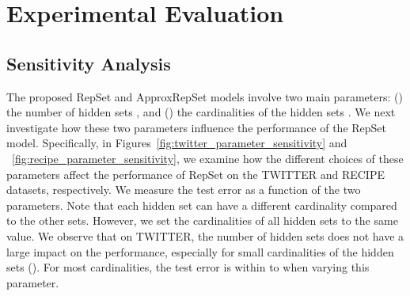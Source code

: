 \documentclass[twoside]{article}
\begin{document}
\section{Experimental Evaluation}\label{sec:further_experiments}

\subsection{Sensitivity Analysis}
The proposed RepSet and ApproxRepSet models involve two main parameters:
() the number of hidden sets , and () the cardinalities of the hidden sets .
We next investigate how these two parameters influence the performance of the RepSet model.
Specifically, in Figures~\ref{fig:twitter_parameter_sensitivity} and ~\ref{fig:recipe_parameter_sensitivity}, we examine how the different choices of these parameters affect the performance of RepSet on the TWITTER and RECIPE datasets, respectively. 
We measure the test error as a function of the two parameters.  
Note that each hidden set  can have a different cardinality compared to the other sets.
However, we set the cardinalities of all hidden sets to the same value.
We observe that on TWITTER, the number of hidden sets  does not have a large impact on the performance, especially for small cardinalities of the hidden sets ().
For most cardinalities, the test error is within  to  when varying this parameter.

\begin{figure*}[t]
\centering
    \begin{minipage}{\columnwidth}
    \centering


\end{minipage}\begin{minipage}{\columnwidth}
    \centering
\end{minipage}
\caption{Average test error of the RepSet model with respect to the number of hidden sets  (left) and the size of the hidden sets  (right) on the TWITTER dataset.}
\label{fig:twitter_parameter_sensitivity}
\end{figure*}

\begin{figure*}[t]
\centering
    \begin{minipage}{\columnwidth}
    \centering
\end{minipage}\begin{minipage}{\columnwidth}
    \centering
\end{minipage}
\caption{Average test error of the RepSet model with respect to the number of hidden sets  (left) and the size of the hidden sets  (right) on the RECIPE dataset.}
\label{fig:recipe_parameter_sensitivity}
\end{figure*}
\end{document}
